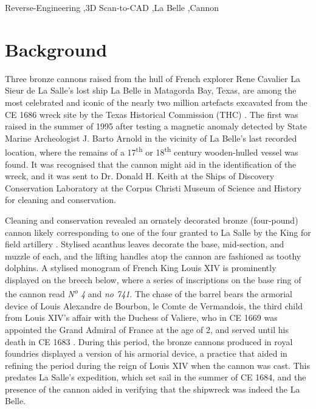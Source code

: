 \documentclass[review]{elsarticle}
\begin{document}
\begin{frontmatter}
\begin{keyword}
Reverse-Engineering \sep 3D Scan-to-CAD \sep La Belle \sep Cannon


\end{keyword}

\end{frontmatter}

\linenumbers

\section*{Background}

Three bronze cannons raised from the hull of French explorer Rene Cavalier La Sieur de La Salle's lost ship La Belle in Matagorda Bay, Texas, are among the most celebrated and iconic of the nearly two million artefacts excavated from the CE 1686 wreck site by the Texas Historical Commission (THC) \citep{RN5767}. The first was raised in the summer of 1995 after testing a magnetic anomaly detected by State Marine Archeologist J. Barto Arnold in the vicinity of La Belle's last recorded location, where the remains of a 17\textsuperscript{th} or 18\textsuperscript{th} century wooden-hulled vessel \citep{RN5766,RN5765} was found. It was recognised that the cannon might aid in the identification of the wreck, and it was sent to Dr. Donald H. Keith at the Ships of Discovery Conservation Laboratory at the Corpus Christi Museum of Science and History for cleaning and conservation.

Cleaning and conservation revealed an ornately decorated bronze (four-pound) cannon likely corresponding to one of the four granted to La Salle by the King for field artillery \citep{RN5763,RN5764}. Stylised acanthus leaves decorate the base, mid-section, and muzzle of each, and the lifting handles atop the cannon are fashioned as toothy dolphins. A stylised monogram of French King Louis XIV is prominently displayed on the breech below, where a series of inscriptions on the base ring of the cannon read \textit{N\textsuperscript{o} 4} and \textit{no  741}. The chase of the barrel bears the armorial device of Louis Alexandre de Bourbon, le Comte de Vermandois, the third child from Louis XIV's affair with the Duchess of Valiere, who in CE 1669 was appointed the Grand Admiral of France at the age of 2, and served until his death in CE 1683 \citep[354]{RN5763}. During this period, the bronze cannons produced in royal foundries displayed a version of his armorial device, a practice that aided in refining the period during the reign of Louis XIV when the cannon was cast. This predates La Salle's expedition, which set sail in the summer of CE 1684, and the presence of the cannon aided in verifying that the shipwreck was indeed the La Belle.
\end{document}
